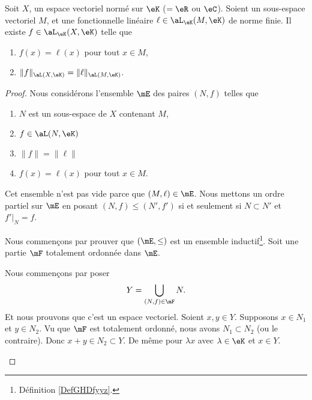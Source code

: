 \begin{theorem}        \label{THOooTZSSooBKfxXE}
	Soit \( X\), un espace vectoriel normé sur \( \eK\) (\(=\eR\) ou \( \eC\)). Soient un sous-espace vectoriel \( M\), et une fonctionnelle linéaire \( \ell\in\aL_{\eK}(M,\eK)\) de norme finie. Il existe \( f\in\aL_{\eK}(X,\eK)\) telle que
	\begin{enumerate}
		\item
		      \( f(x)=\ell(x)\) pour tout \( x\in M\),
		\item
		      \( \| f \|_{\aL(X,\eK)}=\| \ell \|_{\aL(M,\eK)}\).
	\end{enumerate}
\end{theorem}

\begin{proof}
	Nous considérons l'ensemble \( \mE\) des paires \( (N,f)\) telles que
	\begin{enumerate}
		\item
		      \( N\) est un sous-espace de \( X\) contenant \( M\),
		\item
		      \( f\in \aL(N,\eK)\)
		\item
		      \( \| f \|=\| \ell \|\)
		\item
		      \( f(x)=\ell(x)\) pour tout \( x\in M\).
	\end{enumerate}
	Cet ensemble n'est pas vide parce que \( (M, \ell)\in \mE\). Nous mettons un ordre partiel sur \( \mE\) en posant \( (N,f)\leq (N',f')\) si et seulement si \( N\subset N'\) et \( f'|_{N}=f\).
	\begin{subproof}
		Nous commençons par prouver que \( (\mE,\leq)\) est un ensemble inductif\footnote{Définition \ref{DefGHDfyyz}.}. Soit une partie \( \mF\) totalement ordonnée dans \( \mE\).

		\begin{subproof}


			Nous commençons par poser
			\begin{equation}
				Y=\bigcup_{(N,f)\in\mF}N.
			\end{equation}
			Et nous prouvons que c'est un espace vectoriel. Soient \( x,y\in Y\). Supposons \( x\in N_1\) et \( y\in N_2\). Vu que \( \mF\) est totalement ordonné, nous avons \( N_1\subset N_2\) (ou le contraire). Donc \( x+y\in N_2\subset Y\). De même pour \( \lambda x\) avec \( \lambda\in \eK\) et \( x\in Y\).


\end{subproof}
\end{subproof}
\end{proof}
